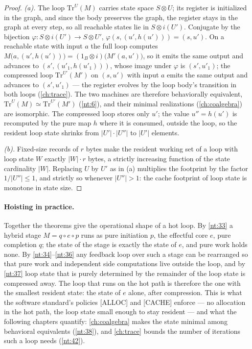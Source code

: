 \begin{proof}
\emph{(a).} The loop $\mathrm{Tr}^{U}(M)$ carries state space $S \otimes
U$; its register is initialized in the graph, and since the body preserves
the graph, the register stays in the graph at every step, so all reachable
states lie in $S \otimes i(U')$. Conjugate by the bijection $\varphi :
S \otimes i(U') \to S \otimes U'$, $\varphi(s, (u', h(u'))) = (s, u')$.
On a reachable state with input $a$ the full loop computes
$M\bigl(a, (u', h(u'))\bigr) = (1_B \otimes i)\bigl(M'(a, u')\bigr)$, so it
emits the same output and advances to $(s', (u'_{1}, h(u'_{1})))$, whose
image under $\varphi$ is $(s', u'_{1})$; the compressed loop
$\mathrm{Tr}^{U'}(M')$ on $(s, u')$ with input $a$ emits the same output
and advances to $(s', u'_{1})$ --- the register evolves by the loop body's
transition in both loops (\autoref{ch:trace}). The two machines are
therefore behaviorally equivalent, $\mathrm{Tr}^{U}(M) \simeq
\mathrm{Tr}^{U'}(M')$ (\autoref{nt:6}), and their minimal realizations
(\autoref{ch:coalgebra}) are isomorphic. The compressed loop stores only
$u'$; the value $u'' = h(u')$ is recomputed by the pure map $h$ where it
is consumed, outside the loop, so the resident loop state shrinks from
$|U'| \cdot |U''|$ to $|U'|$ elements.

\emph{(b).} Fixed-size records of $r$ bytes make the resident working set
of a loop with loop state $W$ exactly $|W| \cdot r$ bytes, a strictly
increasing function of the state cardinality $|W|$. Replacing $U$ by $U'$
as in (a) multiplies the footprint by the factor $1/|U''| \leq 1$, and
strictly so whenever $|U''| > 1$: the cache footprint of loop state is
monotone in state size.
\end{proof}

\paragraph{Hoisting in practice.}
Together the theorems give the operational shape of a hot loop. By
\autoref{nt:33} a hybrid stage $M = q \circ e \circ p$ runs as pure
initiation $p$, the effectful core $e$, pure completion $q$; the state of
the stage is exactly the state of $e$, and pure work holds none. By
\autoref{nt:34}--\autoref{nt:36} any feedback loop over such a stage can be
rearranged so that pure work and independent side computations live outside
the loop, and by \autoref{nt:37} loop state that is purely determined by
the remainder of the loop state is compressed away. The loop that runs on
the hot path is therefore the one with the smallest resident state: the
state of $e$ alone, after compression. This is what the software standard's
policies [ALLOC] and [CACHE] enforce --- no allocation in the hot path, the
loop state small enough to stay resident --- and what the following
chapters quantify: \autoref{ch:coalgebra} makes the state minimal among
behavioral equivalents (\autoref{nt:38}), and \autoref{ch:trace} bounds
the number of iterations such a loop needs (\autoref{nt:42}).
